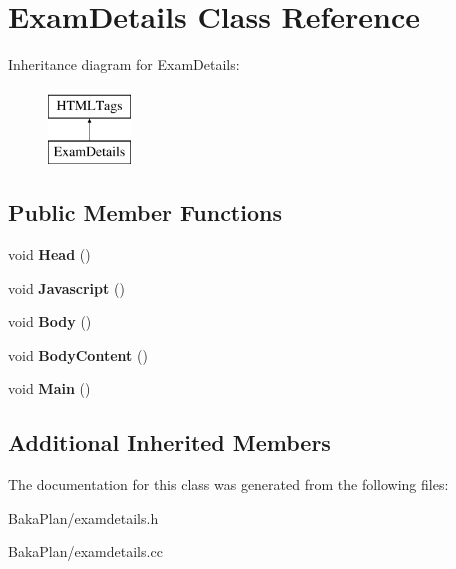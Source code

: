 \hypertarget{classExamDetails}{\section{Exam\-Details Class Reference}
\label{classExamDetails}
}
Inheritance diagram for Exam\-Details\-:\begin{figure}[H]
\begin{center}
\leavevmode
\includegraphics[height=2.000000cm]{classExamDetails}
\end{center}
\end{figure}
\subsection*{Public Member Functions}
\begin{DoxyCompactItemize}
\item 
\hypertarget{classExamDetails_a356f72609abf6d93a6b173af5f28f4db}{void {\bfseries Head} ()}\label{classExamDetails_a356f72609abf6d93a6b173af5f28f4db}

\item 
\hypertarget{classExamDetails_a4925302cb9555f1cadec37872367b0a2}{void {\bfseries Javascript} ()}\label{classExamDetails_a4925302cb9555f1cadec37872367b0a2}

\item 
\hypertarget{classExamDetails_ae8a4c439804372417bcd37976a185626}{void {\bfseries Body} ()}\label{classExamDetails_ae8a4c439804372417bcd37976a185626}

\item 
\hypertarget{classExamDetails_a357e0a4b9116a69af06bd312c809f84e}{void {\bfseries Body\-Content} ()}\label{classExamDetails_a357e0a4b9116a69af06bd312c809f84e}

\item 
\hypertarget{classExamDetails_a9ae3ecade5e455f7b71f4ef46febe71b}{void {\bfseries Main} ()}\label{classExamDetails_a9ae3ecade5e455f7b71f4ef46febe71b}

\end{DoxyCompactItemize}
\subsection*{Additional Inherited Members}


The documentation for this class was generated from the following files\-:\begin{DoxyCompactItemize}
\item 
Baka\-Plan/examdetails.\-h\item 
Baka\-Plan/examdetails.\-cc\end{DoxyCompactItemize}
